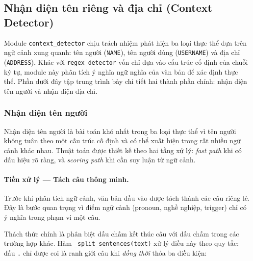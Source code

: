
\subsection{Nhận diện tên riêng và địa chỉ (Context Detector)}

Module \texttt{context\_detector} chịu trách nhiệm phát hiện ba loại thực thể
dựa trên ngữ cảnh xung quanh: tên người (\texttt{NAME}), tên người dùng
(\texttt{USERNAME}) và địa chỉ (\texttt{ADDRESS}).
Khác với \texttt{regex\_detector} vốn chỉ dựa vào cấu trúc cố định của chuỗi
ký tự, module này phân tích ý nghĩa ngữ nghĩa của văn bản để xác định thực thể.
Phần dưới đây tập trung trình bày chi tiết hai thành phần chính: nhận diện tên
người và nhận diện địa chỉ.

\subsubsection{Nhận diện tên người}

Nhận diện tên người là bài toán khó nhất trong ba loại thực thể vì tên người
không tuân theo một cấu trúc cố định và có thể xuất hiện trong rất nhiều ngữ
cảnh khác nhau. Thuật toán được thiết kế theo hai tầng xử lý: \textit{fast
path} khi có dấu hiệu rõ ràng, và \textit{scoring path} khi cần suy luận từ
ngữ cảnh.

\paragraph{Tiền xử lý --- Tách câu thông minh.}
Trước khi phân tích ngữ cảnh, văn bản đầu vào được tách thành các câu riêng
lẻ. Đây là bước quan trọng vì điểm ngữ cảnh (pronoun, nghề nghiệp, trigger)
chỉ có ý nghĩa trong phạm vi một câu.

Thách thức chính là phân biệt dấu chấm kết thúc câu với dấu chấm trong các
trường hợp khác. Hàm \texttt{\_split\_sentences(text)} xử lý điều này theo quy
tắc: dấu \texttt{.} chỉ được coi là ranh giới câu khi \textit{đồng thời} thỏa
ba điều kiện:

